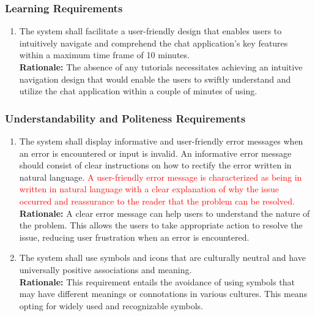 \documentclass[]{article}
\begin{document}
\subsubsection{Learning Requirements}
\label{ssub:learning_requirements}
\begin{enumerate}[{UH-L}1. ]
	\item The system shall facilitate a user-friendly design that enables users to intuitively navigate and comprehend the chat application's key
	      features within a maximum time frame of 10 minutes.\\
	      {\bf Rationale:} The absence of any tutorials necessitates achieving an intuitive navigation design
	      that would enable the users to swiftly understand and utilize the chat application within a couple of minutes of using.
\end{enumerate}
\subsubsection{Understandability and Politeness Requirements}
\label{ssub:understandability_and_politeness_requirements}
\begin{enumerate}[{UH-UP}1. ]
	\item The system shall display informative and user-friendly error messages when an error is encountered or input is invalid.
	      An informative error message should consist of clear instructions on how to rectify the error written in natural language. 
		  \textcolor{red}{A user-friendly error message is characterized as being in written in natural language with a clear explanation of
		  why the issue occurred and reassurance to the reader that the problem can be resolved.}  \\
	      {\bf Rationale:} A clear error message can help users to understand the nature of the problem. This allows the users to
	      take appropriate action to resolve the issue, reducing user frustration when an error is encountered.
	\item The system shall use symbols and icons that are culturally neutral and have universally positive associations and meaning.\\
	      {\bf Rationale:} This requirement entails the avoidance of using symbols that may have different meanings or connotations
	      in various cultures. This means opting for widely used and recognizable symbols.
\end{enumerate}
\end{document}

